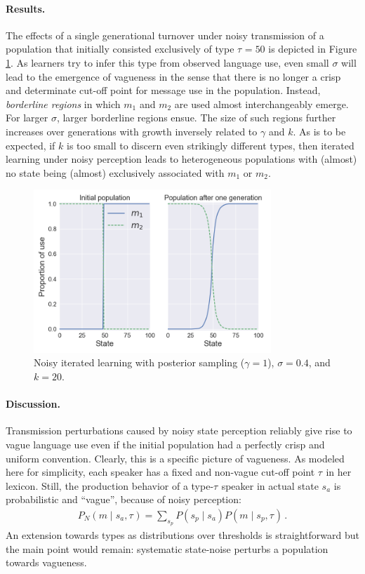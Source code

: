 \documentclass[10pt,a4paper]{article}
\newcommand{\type}[1]{\ensuremath{\tau_{#1}}}
\newcommand{\postparameter}{\ensuremath{\gamma}}
\begin{document}
\paragraph{Results.} The effects of a single generational turnover under noisy transmission of a population that initially consisted exclusively of type $\type{} = 50$ is
depicted in Figure \ref{fig:vag}. As learners try to infer this type from observed language use, even small $\sigma$ will lead to
the emergence of vagueness in the sense that there is no longer a crisp and determinate cut-off
point for message use in the population. Instead, \emph{borderline regions} in which $m_1$ and $m_2$
are used almost interchangeably emerge. For larger $\sigma$, larger borderline regions ensue. The size
of such regions further increases over generations with growth inversely related to $\postparameter$
and $k$. As is to be expected, if $k$ is too small to discern even strikingly different types,
then iterated learning under noisy perception leads to heterogeneous populations with (almost)
no state being (almost) exclusively associated with $m_1$ or $m_2$.

\begin{figure}[ht]
\centering
    \includegraphics[width=\textwidth,height=6.15cm, keepaspectratio]{../code/plots/vag-side-by-side.png}
\caption{Noisy iterated learning with posterior sampling ($\postparameter=1$), $\sigma = 0.4$, and $k = 20$.}
  \label{fig:vag}
\end{figure}
 
\paragraph{Discussion.}
Transmission perturbations caused by noisy state perception reliably give rise to vague
language use even if the initial population had a perfectly crisp and uniform
convention. Clearly, this is a specific picture of vagueness. As modeled here for simplicity,
each speaker has a fixed and non-vague cut-off point $\type{}$ in her lexicon. Still, the production
behavior of a type-$\type{}$ speaker in actual state $s_a$ is probabilistic and ``vague'', because of
noisy perception:
\begin{align*}
  P_N(m \mid s_a, \type{}) = \sum_{s_p} P(s_p \mid s_a) P(m \mid s_p, \type{})\,.
\end{align*}
An extension towards types as distributions over thresholds is straightforward but the main
point would remain: systematic state-noise perturbs a population towards vagueness. 
\end{document}
